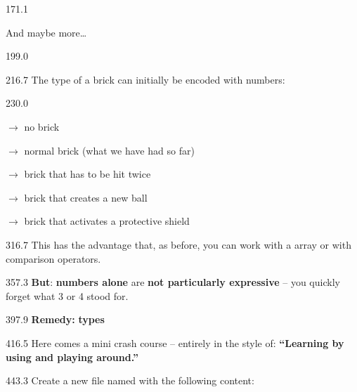 \documentclass{aslab}
\begin{document}
\begin{region}{171.1}
\begin{dashlist}
\item And maybe more\dots
\end{dashlist}
\end{region}

\begin{region}{199.0}
\end{region}

\begin{region}{216.7}
The type of a brick can initially be encoded with numbers:
\end{region}

\begin{region}[pitch=14.67]{230.0}
\begin{dashlist}
\item {} $\rightarrow$ no brick
\item {} $\rightarrow$ normal brick (what we have had so far)
\item {} $\rightarrow$ brick that has to be hit twice
\item {} $\rightarrow$ brick that creates a new ball
\item {} $\rightarrow$ brick that activates a protective shield
\end{dashlist}
\end{region}

\begin{region}[pitch=13.3]{316.7}
This has the advantage that, as before, you can work with a 
array or with comparison operators.
\end{region}

\begin{region}[pitch=13.3]{357.3}
\textbf{But}: \textbf{numbers alone} are \textbf{not particularly
expressive} -- you quickly forget what 3 or 4 stood for.
\end{region}

\begin{region}{397.9}
\textbf{Remedy:}  \textbf{types}
\end{region}

\begin{region}{416.5}
Here comes a mini crash course -- entirely in the style of:
\textbf{``Learning by using and playing around.''}
\end{region}

\begin{region}{443.3}
Create a new file named  with the following content:
\end{region}
\end{document}
